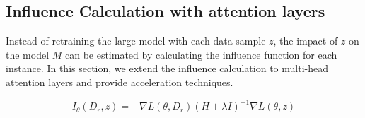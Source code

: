 \documentclass{article} %
\begin{document}
\subsection{Influence Calculation with attention layers}
\label{sec:ek-fac}
Instead of retraining the large model with each data sample $z$, the impact of  $z$ on the model $M$ can be estimated by calculating the influence function for each instance. In this section, we extend the influence calculation to multi-head attention layers and provide acceleration techniques.

\begin{equation}
    I_\theta(D_r,z)=-\nabla L(\theta,D_r)(H + \lambda I)^{-1}\nabla L(\theta,z)
\end{equation}





%
\end{document}

